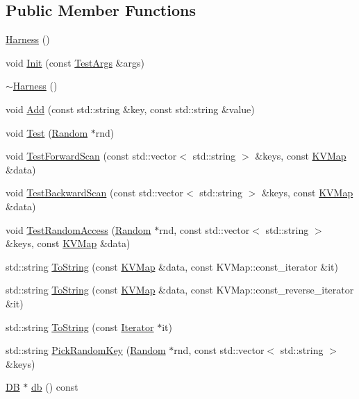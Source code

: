 \subsection*{Public Member Functions}
\begin{DoxyCompactItemize}
\item 
\hyperlink{classleveldb_1_1_harness_a37601b2f232e45cb7607aa8d2ecb25db}{Harness} ()
\item 
void \hyperlink{classleveldb_1_1_harness_a2aba24255691eaad2a57ee43cbc9ddc1}{Init} (const \hyperlink{structleveldb_1_1_test_args}{Test\+Args} \&args)
\item 
\hyperlink{classleveldb_1_1_harness_a9956e6945c11e5024ae1f82fd8528343}{$\sim$\+Harness} ()
\item 
void \hyperlink{classleveldb_1_1_harness_a019ddc8e52dc5cfaac85f53993ab1ed4}{Add} (const std\+::string \&key, const std\+::string \&value)
\item 
void \hyperlink{classleveldb_1_1_harness_a78dbb5352b51e22bbc449bad7c1a9176}{Test} (\hyperlink{classleveldb_1_1_random}{Random} $\ast$rnd)
\item 
void \hyperlink{classleveldb_1_1_harness_ac5ff108406a08a6e3e22318246d206ef}{Test\+Forward\+Scan} (const std\+::vector$<$ std\+::string $>$ \&keys, const \hyperlink{namespaceleveldb_aac1e50450147be263e08252c6700f7a7}{K\+V\+Map} \&data)
\item 
void \hyperlink{classleveldb_1_1_harness_aba7a2c48101cd9d024be64080ebed363}{Test\+Backward\+Scan} (const std\+::vector$<$ std\+::string $>$ \&keys, const \hyperlink{namespaceleveldb_aac1e50450147be263e08252c6700f7a7}{K\+V\+Map} \&data)
\item 
void \hyperlink{classleveldb_1_1_harness_adb4b24bd89b600a67b0cd52ff64af9cd}{Test\+Random\+Access} (\hyperlink{classleveldb_1_1_random}{Random} $\ast$rnd, const std\+::vector$<$ std\+::string $>$ \&keys, const \hyperlink{namespaceleveldb_aac1e50450147be263e08252c6700f7a7}{K\+V\+Map} \&data)
\item 
std\+::string \hyperlink{classleveldb_1_1_harness_a69962f92cdd4fdc5d1f91d8c3cbebb3f}{To\+String} (const \hyperlink{namespaceleveldb_aac1e50450147be263e08252c6700f7a7}{K\+V\+Map} \&data, const K\+V\+Map\+::const\+\_\+iterator \&it)
\item 
std\+::string \hyperlink{classleveldb_1_1_harness_a7589308a4592b9edb4142825b743244c}{To\+String} (const \hyperlink{namespaceleveldb_aac1e50450147be263e08252c6700f7a7}{K\+V\+Map} \&data, const K\+V\+Map\+::const\+\_\+reverse\+\_\+iterator \&it)
\item 
std\+::string \hyperlink{classleveldb_1_1_harness_a1cdf351918a2e969bce1c29290317403}{To\+String} (const \hyperlink{classleveldb_1_1_iterator}{Iterator} $\ast$it)
\item 
std\+::string \hyperlink{classleveldb_1_1_harness_ab6f2d80f97eb56fc65d4a9177cd86c03}{Pick\+Random\+Key} (\hyperlink{classleveldb_1_1_random}{Random} $\ast$rnd, const std\+::vector$<$ std\+::string $>$ \&keys)
\item 
\hyperlink{classleveldb_1_1_d_b}{D\+B} $\ast$ \hyperlink{classleveldb_1_1_harness_ac278dc1cfc6a3b9f6ebc5ac93ccb42a7}{db} () const 
\end{DoxyCompactItemize}
